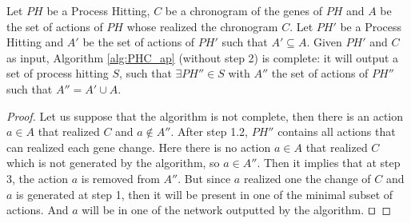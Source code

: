 %

\begin{theorem}[Completeness]%
	\label{th:correct}
	Let $PH$ be a Process Hitting, $C$ be a chronogram of the genes of $PH$ and $A$ be the set of actions of $PH$ whose realized the chronogram $C$.
	Let $PH'$ be a Process Hitting and $A'$ be the set of actions of $PH'$ such that $A' \subseteq A$.
	Given $PH'$ and $C$ as input, Algorithm \ref{alg:PHC_ap} (without step 2) is complete:
	it will output a set of process hitting $S$,
	such that $\exists PH'' \in S$ with $A''$ the set of actions of $PH''$ such that $A'' = A' \cup A$.
	\begin{proof}
	Let us suppose that the algorithm is not complete, then there is an action $a \in A$ that realized $C$ and $a \not \in A''$.
	After step 1.2, $PH''$ contains all actions that can realized each gene change.
	Here there is no action $a \in A$ that realized $C$ which is not generated by the algorithm, so $a \in A''$.
	Then it implies that at step 3, the action $a$ is removed from $A''$.
	But since $a$ realized one the change of $C$ and $a$ is generated at step 1, then it will be present in one of the minimal subset of actions.
	And $a$ will be in one of the network outputted by the algorithm.
	$\qed$
	\end{proof}
\end{theorem}



